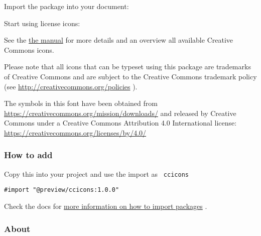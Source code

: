 Import the package into your document:

\begin{Shaded}
\begin{Highlighting}[]
\end{Highlighting}
\end{Shaded}

Start using license icons:

\begin{Shaded}
\begin{Highlighting}[]
\end{Highlighting}
\end{Shaded}

See the
\href{https://github.com/typst/packages/raw/main/packages/preview/ccicons/1.0.0/docs/ccicons-manual.pdf}{the
manual} for more details and an overview all available Creative Commons
icons.

Please note that all icons that can be typeset using this package are
trademarks of Creative Commons and are subject to the Creative Commons
trademark policy (see \url{http://creativecommons.org/policies} ).

The symbols in this font have been obtained from
\url{https://creativecommons.org/mission/downloads/} and released by
Creative Commons under a Creative Commons Attribution 4.0 International
license: \url{https://creativecommons.org/licenses/by/4.0/}

\subsubsection{How to add}\label{how-to-add}

Copy this into your project and use the import as \texttt{\ ccicons\ }

\begin{verbatim}
#import "@preview/ccicons:1.0.0"
\end{verbatim}



Check the docs for
\href{https://typst.app/docs/reference/scripting/\#packages}{more
information on how to import packages} .

\subsubsection{About}\label{about}

